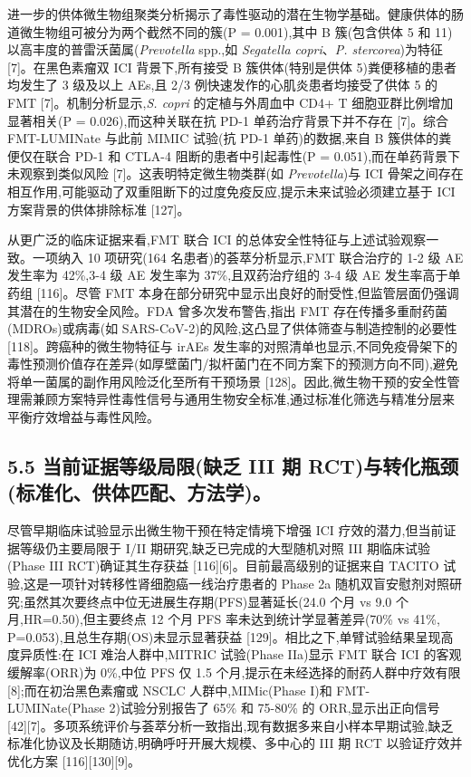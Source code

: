 \documentclass[11pt]{article}
\begin{document}
进一步的供体微生物组聚类分析揭示了毒性驱动的潜在生物学基础。健康供体的肠道微生物组可被分为两个截然不同的簇(P = 0.001),其中 B 簇(包含供体 5 和 11)以高丰度的普雷沃菌属(\emph{Prevotella} spp.,如 \emph{Segatella copri}、\emph{P. stercorea})为特征 {[}7{]}。在黑色素瘤双 ICI 背景下,所有接受 B 簇供体(特别是供体 5)粪便移植的患者均发生了 3 级及以上 AEs,且 2/3 例快速发作的心肌炎患者均接受了供体 5 的 FMT {[}7{]}。机制分析显示,\emph{S. copri} 的定植与外周血中 CD4+ T 细胞亚群比例增加显著相关(P = 0.026),而这种关联在抗 PD-1 单药治疗背景下并不存在 {[}7{]}。综合 FMT-LUMINate 与此前 MIMIC 试验(抗 PD-1 单药)的数据,来自 B 簇供体的粪便仅在联合 PD-1 和 CTLA-4 阻断的患者中引起毒性(P = 0.051),而在单药背景下未观察到类似风险 {[}7{]}。这表明特定微生物类群(如 \emph{Prevotella})与 ICI 骨架之间存在相互作用,可能驱动了双重阻断下的过度免疫反应,提示未来试验必须建立基于 ICI 方案背景的供体排除标准 {[}127{]}。

从更广泛的临床证据来看,FMT 联合 ICI 的总体安全性特征与上述试验观察一致。一项纳入 10 项研究(164 名患者)的荟萃分析显示,FMT 联合治疗的 1-2 级 AE 发生率为 42\%,3-4 级 AE 发生率为 37\%,且双药治疗组的 3-4 级 AE 发生率高于单药组 {[}116{]}。尽管 FMT 本身在部分研究中显示出良好的耐受性,但监管层面仍强调其潜在的生物安全风险。FDA 曾多次发布警告,指出 FMT 存在传播多重耐药菌(MDROs)或病毒(如 SARS-CoV-2)的风险,这凸显了供体筛查与制造控制的必要性 {[}118{]}。跨癌种的微生物特征与 irAEs 发生率的对照清单也显示,不同免疫骨架下的毒性预测价值存在差异(如厚壁菌门/拟杆菌门在不同方案下的预测方向不同),避免将单一菌属的副作用风险泛化至所有干预场景 {[}128{]}。因此,微生物干预的安全性管理需兼顾方案特异性毒性信号与通用生物安全标准,通过标准化筛选与精准分层来平衡疗效增益与毒性风险。

\subsection{5.5 当前证据等级局限(缺乏 III 期 RCT)与转化瓶颈(标准化、供体匹配、方法学)。}\label{ux5f53ux524dux8bc1ux636eux7b49ux7ea7ux5c40ux9650ux7f3aux4e4f-iii-ux671f-rctux4e0eux8f6cux5316ux74f6ux9888ux6807ux51c6ux5316ux4f9bux4f53ux5339ux914dux65b9ux6cd5ux5b66}

尽管早期临床试验显示出微生物干预在特定情境下增强 ICI 疗效的潜力,但当前证据等级仍主要局限于 I/II 期研究,缺乏已完成的大型随机对照 III 期临床试验(Phase III RCT)确证其生存获益 {[}116{]}{[}6{]}。目前最高级别的证据来自 TACITO 试验,这是一项针对转移性肾细胞癌一线治疗患者的 Phase 2a 随机双盲安慰剂对照研究;虽然其次要终点中位无进展生存期(PFS)显著延长(24.0 个月 vs 9.0 个月,HR=0.50),但主要终点 12 个月 PFS 率未达到统计学显著差异(70\% vs 41\%, P=0.053),且总生存期(OS)未显示显著获益 {[}129{]}。相比之下,单臂试验结果呈现高度异质性:在 ICI 难治人群中,MITRIC 试验(Phase IIa)显示 FMT 联合 ICI 的客观缓解率(ORR)为 0\%,中位 PFS 仅 1.5 个月,提示在未经选择的耐药人群中疗效有限 {[}8{]};而在初治黑色素瘤或 NSCLC 人群中,MIMic(Phase I)和 FMT-LUMINate(Phase 2)试验分别报告了 65\% 和 75-80\% 的 ORR,显示出正向信号 {[}42{]}{[}7{]}。多项系统评价与荟萃分析一致指出,现有数据多来自小样本早期试验,缺乏标准化协议及长期随访,明确呼吁开展大规模、多中心的 III 期 RCT 以验证疗效并优化方案 {[}116{]}{[}130{]}{[}9{]}。
\end{document}

